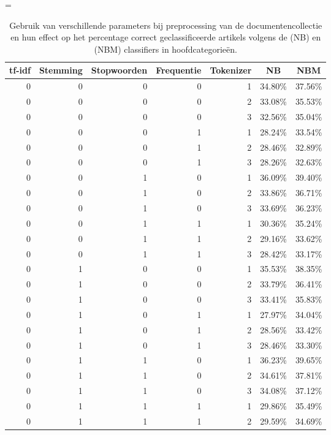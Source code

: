 \LTcapwidth=\textwidth
\begin{longtable}{rrrrrrr}
	\caption{Gebruik van verschillende parameters bij preprocessing van de documentencollectie  en hun effect op het percentage correct geclassificeerde artikels volgens de  (NB) en  (NBM) classifiers in hoofdcategorie\"en.}\\
	\toprule
	\multicolumn{1}{c}{\textbf{tf-idf}} & \multicolumn{1}{c}{\textbf{Stemming}} & \multicolumn{1}{c}{\textbf{Stopwoorden}} & \multicolumn{1}{c}{\textbf{Frequentie}} & \multicolumn{1}{c}{\textbf{Tokenizer}} & \multicolumn{1}{c}{\textbf{NB}} & \multicolumn{1}{c}{\textbf{NBM}} \\
	\midrule
0	& 0	& 0	& 0	& 1	& 34.80\%	& 37.56\% \\
0	& 0	& 0	& 0	& 2	& 33.08\%	& 35.53\% \\
0	& 0	& 0	& 0	& 3	& 32.56\%	& 35.04\% \\
0	& 0	& 0	& 1	& 1	& 28.24\%	& 33.54\% \\
0	& 0	& 0	& 1	& 2	& 28.46\%	& 32.89\% \\
0	& 0	& 0	& 1	& 3	& 28.26\%	& 32.63\% \\
0	& 0	& 1	& 0	& 1	& 36.09\%	& 39.40\% \\
0	& 0	& 1	& 0	& 2	& 33.86\%	& 36.71\% \\
0	& 0	& 1	& 0	& 3	& 33.69\%	& 36.23\% \\
0	& 0	& 1	& 1	& 1	& 30.36\%	& 35.24\% \\
0	& 0	& 1	& 1	& 2	& 29.16\%	& 33.62\% \\
0	& 0	& 1	& 1	& 3	& 28.42\%	& 33.17\% \\
0	& 1	& 0	& 0	& 1	& 35.53\%	& 38.35\% \\
0	& 1	& 0	& 0	& 2	& 33.79\%	& 36.41\% \\
0	& 1	& 0	& 0	& 3	& 33.41\%	& 35.83\% \\
0	& 1	& 0	& 1	& 1	& 27.97\%	& 34.04\% \\
0	& 1	& 0	& 1	& 2	& 28.56\%	& 33.42\% \\
0	& 1	& 0	& 1	& 3	& 28.46\%	& 33.30\% \\
0	& 1	& 1	& 0	& 1	& 36.23\%	& 39.65\% \\
0	& 1	& 1	& 0	& 2	& 34.61\%	& 37.81\% \\
0	& 1	& 1	& 0	& 3	& 34.08\%	& 37.12\% \\
0	& 1	& 1	& 1	& 1	& 29.86\%	& 35.49\% \\
0	& 1	& 1	& 1	& 2	& 29.59\%	& 34.69\% \\

\end{longtable}
